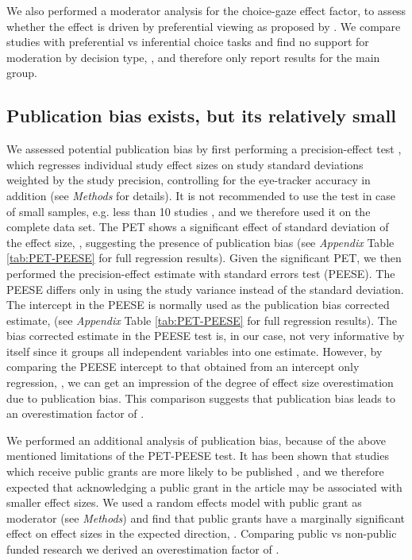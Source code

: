 We also performed a moderator analysis for the choice-gaze effect factor, to assess whether the effect is driven by preferential viewing as proposed by \cite{shimojo2003a}. We compare studies with preferential vs inferential choice tasks and find no support for moderation by decision type, \unskip, and therefore only report results for the main group. 



\subsection{Publication bias exists, but its relatively small}

We assessed potential publication bias by first performing a precision-effect test \citep[PET][]{stanley2014}, which regresses individual study effect sizes on study standard deviations weighted by the study precision, controlling for the eye-tracker accuracy in addition (see \textit{Methods} for details). It is not recommended to use the test in case of small samples, e.g. less than 10 studies \citep{vanaert2019}, and we therefore used it on the complete data set. The PET shows a significant effect of standard deviation of the effect size, \unskip, suggesting the presence of publication bias (see \textit{Appendix} Table \ref{tab:PET-PEESE} for full regression results). Given the significant PET, we then performed the precision-effect estimate with standard errors test (PEESE). The PEESE differs only in using the study variance instead of the standard deviation. The intercept in the PEESE is normally used as the publication bias corrected estimate,  (see \textit{Appendix} Table \ref{tab:PET-PEESE} for full regression results). The bias corrected estimate in the PEESE test is, in our case, not very informative by itself since it groups all independent variables into one estimate. However, by comparing the PEESE intercept to that obtained from an intercept only regression, \unskip, we can get an impression of the degree of effect size overestimation due to publication bias. This comparison suggests that publication bias leads to an overestimation factor of \unskip. 

We performed an additional analysis of publication bias, because of the above mentioned limitations of the PET-PEESE test. It has been shown that studies which receive public grants are more likely to be published \citep{canestaro2017}, and we therefore expected that acknowledging a public grant in the article may be associated with smaller effect sizes. We used a random effects model with public grant as moderator (see \textit{Methods}) and find that public grants have a marginally significant effect on effect sizes in the expected direction, \unskip. Comparing public vs non-public funded research we derived an overestimation factor of \unskip. 


